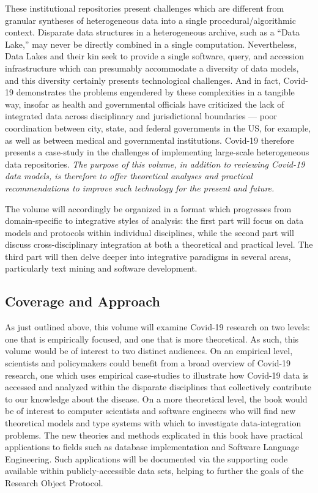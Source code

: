 \documentclass{statsoc}
\newcommand{\p}[1]{

\vspace{.75em}#1}
\newcommand{\q}[1]{{\fontfamily{qcr}\selectfont ``}#1{\fontfamily{qcr}\selectfont ''}}
\begin{document}
{\p{These institutional repositories present 
challenges which are different from granular 
syntheses of heterogeneous data into a single 
procedural/algorithmic context.  Disparate data structures 
in a heterogeneous archive, such as a \q{Data Lake,} may 
never be directly combined in a single computation.  
Nevertheless, Data Lakes and their kin seek to 
provide a single software, query, and accession infrastructure 
which can presumably accommodate a diversity of data models, and 
this diversity certainly presents technological challenges.  
And in fact, Covid-19 demonstrates the problems 
engendered by these complexities in a tangible way, 
insofar as health and governmental officials have criticized 
the lack of integrated data across disciplinary and 
jurisdictional boundaries --- poor coordination between 
city, state, and federal governments in the US, for 
example, as well as between medical and governmental institutions.  
Covid-19 therefore presents a case-study in the challenges 
of implementing large-scale heterogeneous data repositories.  
\textit{The purpose of this volume, in addition to 
reviewing Covid-19 data models, is therefore to offer theoretical analyses 
and practical recommendations to improve such 
technology for the present and future.}} 

\p{The volume will accordingly be organized in a 
format which progresses from domain-specific to integrative 
styles of analysis: the first part will focus on data 
models and protocols within individual disciplines, 
while the second part will discuss 
cross-disciplinary integration at both a theoretical and 
practical level.  The third part will then delve deeper 
into integrative paradigms in several areas, particularly 
text mining and software development.}  

\subsection{Coverage and Approach}

\p{As just outlined above, this volume will examine 
Covid-19 research on two levels: one that is  
empirically focused, and one that is more theoretical.  As 
such, this volume would be of interest 
to two distinct audiences.  On an empirical level, 
scientists and policymakers could benefit 
from a broad overview of Covid-19 research, 
one which uses empirical case-studies to 
illustrate how Covid-19 data is accessed and 
analyzed within the disparate disciplines that 
collectively contribute to our knowledge 
about the disease.  On a more theoretical 
level, the book would be of interest to 
computer scientists and software engineers 
who will find new theoretical models and 
type systems with which to investigate 
data-integration problems.  The new 
theories and methods explicated in this book have practical 
applications to fields such as database implementation and 
Software Language Engineering.  Such applications will be 
documented via the supporting code available 
within publicly-accessible data sets, helping 
to further the goals of the Research Object Protocol.}

}
\end{document}
